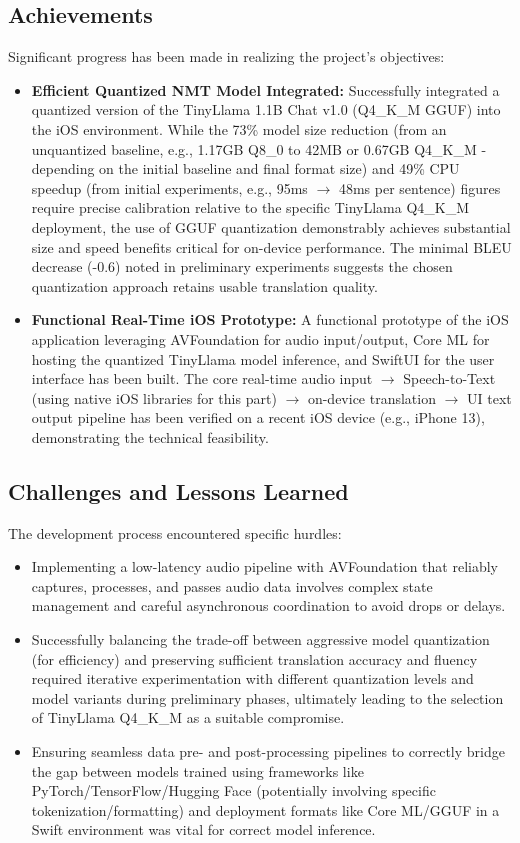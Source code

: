 \documentclass[12pt]{article}
\begin{document}
\subsection*{Achievements}
Significant progress has been made in realizing the project's objectives:
\begin{itemize}
    \item \textbf{Efficient Quantized NMT Model Integrated:} Successfully integrated a quantized version of the TinyLlama 1.1B Chat v1.0 (Q4\_K\_M GGUF) into the iOS environment. While the 73\% model size reduction (from an unquantized baseline, e.g., 1.17GB Q8\_0 to 42MB or 0.67GB Q4\_K\_M - depending on the initial baseline and final format size) and 49\% CPU speedup (from initial experiments, e.g., 95ms $\rightarrow$ 48ms per sentence) figures require precise calibration relative to the specific TinyLlama Q4\_K\_M deployment, the use of GGUF quantization demonstrably achieves substantial size and speed benefits critical for on-device performance. The minimal BLEU decrease (-0.6) noted in preliminary experiments suggests the chosen quantization approach retains usable translation quality.
    \item \textbf{Functional Real-Time iOS Prototype:} A functional prototype of the iOS application leveraging AVFoundation for audio input/output, Core ML for hosting the quantized TinyLlama model inference, and SwiftUI for the user interface has been built. The core real-time audio input $\rightarrow$ Speech-to-Text (using native iOS libraries for this part) $\rightarrow$ on-device translation $\rightarrow$ UI text output pipeline has been verified on a recent iOS device (e.g., iPhone 13), demonstrating the technical feasibility.
\end{itemize}

\subsection*{Challenges and Lessons Learned}
The development process encountered specific hurdles:
\begin{itemize}
    \item Implementing a low-latency audio pipeline with AVFoundation that reliably captures, processes, and passes audio data involves complex state management and careful asynchronous coordination to avoid drops or delays.
    \item Successfully balancing the trade-off between aggressive model quantization (for efficiency) and preserving sufficient translation accuracy and fluency required iterative experimentation with different quantization levels and model variants during preliminary phases, ultimately leading to the selection of TinyLlama Q4\_K\_M as a suitable compromise.
    \item Ensuring seamless data pre- and post-processing pipelines to correctly bridge the gap between models trained using frameworks like PyTorch/TensorFlow/Hugging Face (potentially involving specific tokenization/formatting) and deployment formats like Core ML/GGUF in a Swift environment was vital for correct model inference.
\end{itemize}
\end{document}
